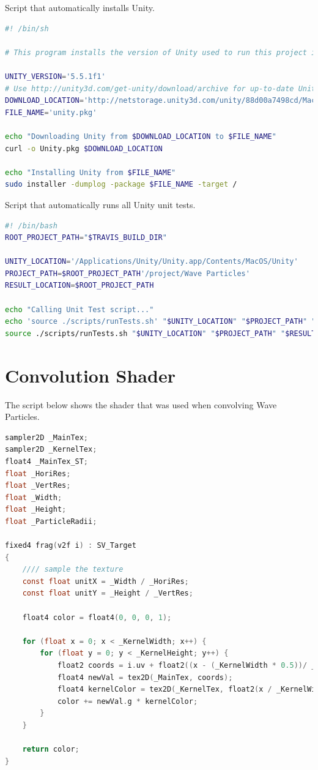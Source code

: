 \documentclass[12pt,a4paper,twoside]{report}
\begin{document}
Script that automatically installs Unity.

\begin{lstlisting}[language=Bash]
#! /bin/sh

# This program installs the version of Unity used to run this project in Travis CI

UNITY_VERSION='5.5.1f1'
# Use http://unity3d.com/get-unity/download/archive for up-to-date Unity links
DOWNLOAD_LOCATION='http://netstorage.unity3d.com/unity/88d00a7498cd/MacEditorInstaller/Unity-'"$UNITY_VERSION"'.pkg'
FILE_NAME='unity.pkg'

echo "Downloading Unity from $DOWNLOAD_LOCATION to $FILE_NAME"
curl -o Unity.pkg $DOWNLOAD_LOCATION

echo "Installing Unity from $FILE_NAME"
sudo installer -dumplog -package $FILE_NAME -target /
\end{lstlisting}

Script that automatically runs all Unity unit tests.

\begin{lstlisting}[language=Bash]
#! /bin/bash
ROOT_PROJECT_PATH="$TRAVIS_BUILD_DIR"

UNITY_LOCATION='/Applications/Unity/Unity.app/Contents/MacOS/Unity'
PROJECT_PATH=$ROOT_PROJECT_PATH'/project/Wave Particles'
RESULT_LOCATION=$ROOT_PROJECT_PATH

echo "Calling Unit Test script..."
echo 'source ./scripts/runTests.sh' "$UNITY_LOCATION" "$PROJECT_PATH" "$RESULT_LOCATION"
source ./scripts/runTests.sh "$UNITY_LOCATION" "$PROJECT_PATH" "$RESULT_LOCATION" python3
\end{lstlisting}

\chapter{Convolution Shader}
\label{app:convolution_shader}

The script below shows the shader that was used when convolving Wave Particles. 
\begin{lstlisting}[language=C]
sampler2D _MainTex;
sampler2D _KernelTex;
float4 _MainTex_ST;
float _HoriRes;
float _VertRes;
float _Width;
float _Height;
float _ParticleRadii;

fixed4 frag(v2f i) : SV_Target
{
    //// sample the texture
    const float unitX = _Width / _HoriRes;
    const float unitY = _Height / _VertRes;

    float4 color = float4(0, 0, 0, 1);

    for (float x = 0; x < _KernelWidth; x++) {
        for (float y = 0; y < _KernelHeight; y++) {
            float2 coords = i.uv + float2((x - (_KernelWidth * 0.5))/ _HoriRes, (y - (_KernelHeight * 0.5)) / _VertRes);
            float4 newVal = tex2D(_MainTex, coords);
            float4 kernelColor = tex2D(_KernelTex, float2(x / _KernelWidth, y / _KernelHeight));
            color += newVal.g * kernelColor;
        }
    }

    return color;
}
\end{lstlisting}
\end{document}
